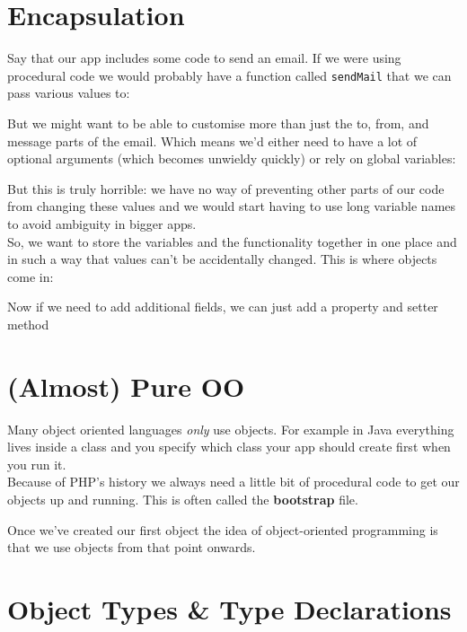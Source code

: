 \pagebreak


\section{Encapsulation}

Say that our app includes some code to send an email. If we were using procedural code we would probably have a function called \texttt{sendMail} that we can pass various values to:


But we might want to be able to customise more than just the to, from, and message parts of the email. Which means we'd either need to have a lot of optional arguments (which becomes unwieldy quickly) or rely on global variables:


But this is truly horrible: we have no way of preventing other parts of our code from changing these values and we would start having to use long variable names to avoid ambiguity in bigger apps.
\\

So, we want to store the variables and the functionality together in one place and in such a way that values can't be accidentally changed. This is where objects come in:


Now if we need to add additional fields, we can just add a property and setter method


\section{(Almost) Pure OO}

Many object oriented languages \textit{only} use objects. For example in Java everything lives inside a class and you specify which class your app should create first when you run it.
\\

Because of PHP's history we always need a little bit of procedural code to get our objects up and running. This is often called the \textbf{bootstrap} file.


Once we've created our first object the idea of object-oriented programming is that we use objects from that point onwards.


\section{Object Types \& Type Declarations}

